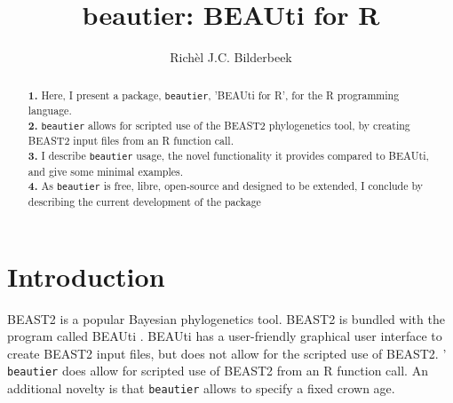 \documentclass{article}
\title{beautier: BEAUti for R}
\author{Rich\`el J.C. Bilderbeek}
\begin{document}
\maketitle

\begin{abstract}
  \textbf{1. }
  Here, I present a package, \verb;beautier;, 'BEAUti for R', for the R programming language. \\
  \textbf{2. }
    \verb;beautier; allows for scripted use of the BEAST2 phylogenetics tool, 
    by creating BEAST2 input files from an R function call. \\
  \textbf{3. }
    I describe \verb;beautier; usage, the novel functionality it provides
    compared to BEAUti, and give some minimal examples. \\
  \textbf{4. }
    As \verb;beautier; is free, libre, open-source and designed to be extended, 
    I conclude by describing the current development of the package \\
\end{abstract}


\section{Introduction}

BEAST2 \cite{bouckaert2014beast} is a popular Bayesian phylogenetics tool.
BEAST2 is bundled with the program called BEAUti \cite{drummond2012bayesian}.
BEAUti has a user-friendly graphical user interface to create BEAST2 input files,
but does not allow for the scripted use of BEAST2. '
\verb;beautier; does allow for scripted use of BEAST2 from an R function call.
An additional novelty is that \verb;beautier; allows to specify a fixed crown age.

\end{document}
